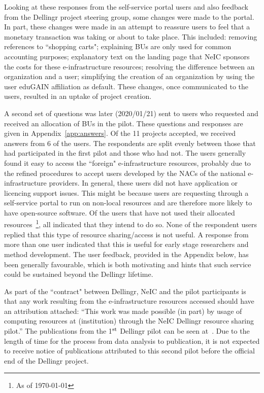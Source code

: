 \documentclass{article}
\newcommand{\dell}{Dellingr\xspace}
\newcommand{\einfra}{e-infrastructure\xspace}
\newcommand{\accepted}{11\xspace}
\begin{document}
Looking at these responses from the self-service portal users and also feedback from the \dell project steering group, some changes were made to the portal.
In part, these changes were made in an attempt to reassure users to feel that
a monetary transaction was taking or about to take place.
This included: removing references to ``shopping carts"; explaining BUs are only used for common accounting purposes; explanatory text on the landing page that NeIC sponsors the costs for these \einfra resources; resolving the difference between an organization and a user; simplifying the creation of an organization by using the user eduGAIN affiliation as default.
These changes, once communicated to the users, resulted in an uptake of project creation.

A second set of questions was later (2020/01/21) sent to users 
who requested and received an allocation of BUs in the pilot.
These questions and responses are given in Appendix~\ref{app:answers}.
Of the \accepted projects accepted, we received answers from 6 of the users.
The respondents are split evenly between those that had participated in the first pilot and those who had not.
The users generally found it easy to access the ``foreign" \einfra resources, probably due to the refined procedures to accept users developed by the NACs of the national \einfra providers.
In general, these users did not have application or licencing support issues.
This might be because users are requesting through a self-service portal to run on non-local resources and are therefore more likely to have open-source software.
Of the users that have not used their allocated resources~\footnote{As of \today}, all indicated that they intend to do so.
None of the respondent users replied that this type of resource sharing/access
is not useful.
A response from more than one user indicated that this is useful for early stage researchers and method development.
The user feedback, provided in the Appendix below, has been generally favourable, which is both motivating and hints that such service could be sustained beyond the \dell lifetime.

As part of the ``contract" between \dell, NeIC and the pilot participants is that any work resulting from the \einfra resources accessed should have an attribution attached: 
``This work was made possible (in part) by usage of computing resources at (institution) through the NeIC Dellingr resource sharing pilot.''
The publications from the 1$^{\rm st}$ \dell pilot can be seen at~\cite{pilot-pubs}.
Due to the length of time for the process from data analysis to publication, it is not expected to receive notice of publications attributed to this second pilot before the official end of the \dell project.
\end{document}
